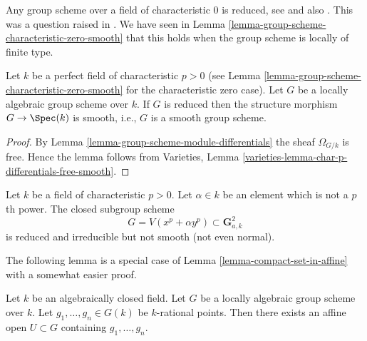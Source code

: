 \begin{remark}
\label{remark-when-reduced}
Any group scheme over a field of characteristic $0$ is reduced, see
\cite[I, Theorem 1.1 and I, Corollary 3.9, and II, Theorem 2.4]{Perrin-thesis}
and also
\cite[Proposition 4.2.8]{Perrin}.
This was a question raised in
\cite[page 80]{Oort}.
We have seen in
Lemma \ref{lemma-group-scheme-characteristic-zero-smooth}
that this holds when the group scheme is locally of finite type.
\end{remark}

\begin{lemma}
\label{lemma-reduced-group-scheme-prefect-field-characteristic-p-smooth}
Let $k$ be a perfect field of characteristic $p > 0$ (see
Lemma \ref{lemma-group-scheme-characteristic-zero-smooth}
for the characteristic zero case).
Let $G$ be a locally algebraic group scheme over $k$.
If $G$ is reduced then the structure
morphism $G \to \Spec(k)$ is smooth, i.e., $G$ is a smooth
group scheme.
\end{lemma}

\begin{proof}
By
Lemma \ref{lemma-group-scheme-module-differentials}
the sheaf $\Omega_{G/k}$ is free. Hence the lemma follows from
Varieties, Lemma \ref{varieties-lemma-char-p-differentials-free-smooth}.
\end{proof}

\begin{remark}
\label{remark-reduced-smooth-not-true-general}
Let $k$ be a field of characteristic $p > 0$.
Let $\alpha \in k$ be an element which is not a $p$th power.
The closed subgroup scheme
$$
G = V(x^p + \alpha y^p) \subset \mathbf{G}_{a, k}^2
$$
is reduced and irreducible but not smooth (not even normal).
\end{remark}

\noindent
The following lemma is a special case of
Lemma \ref{lemma-compact-set-in-affine}
with a somewhat easier proof.

\begin{lemma}
\label{lemma-points-in-affine}
Let $k$ be an algebraically closed field.
Let $G$ be a locally algebraic group scheme over $k$.
Let $g_1, \ldots, g_n \in G(k)$ be $k$-rational points.
Then there exists an affine open $U \subset G$ containing $g_1, \ldots, g_n$.
\end{lemma}

